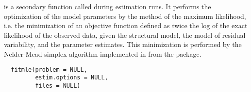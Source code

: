 %
\begin{Description}\relax
{} is a secondary function called during estimation runs. It performs the optimization
of the model parameters by the method of the maximum likelihood, i.e. the minimization of an
objective function defined as twice the log of the exact likelihood of the observed data, given the
structural model, the model of residual variability, and the parameter estimates. This minimization
is performed by the Nelder-Mead simplex algorithm implemented in  from the
 package.
\end{Description}
%
\begin{Usage}
\begin{verbatim}
  fitmle(problem = NULL,
         estim.options = NULL,
         files = NULL)
\end{verbatim}
\end{Usage}
%
